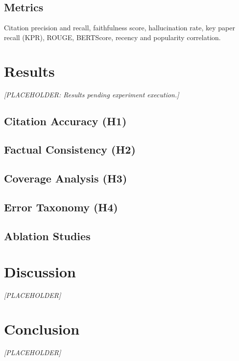 \documentclass{article}
\begin{document}
\subsection{Metrics}
Citation precision and recall, faithfulness score, hallucination rate, key
paper recall (KPR), ROUGE, BERTScore, recency and popularity correlation.

\section{Results}

\textit{[PLACEHOLDER: Results pending experiment execution.]}

\subsection{Citation Accuracy (H1)}
\subsection{Factual Consistency (H2)}
\subsection{Coverage Analysis (H3)}
\subsection{Error Taxonomy (H4)}
\subsection{Ablation Studies}

\section{Discussion}

\textit{[PLACEHOLDER]}

\section{Conclusion}

\textit{[PLACEHOLDER]}



\end{document}
